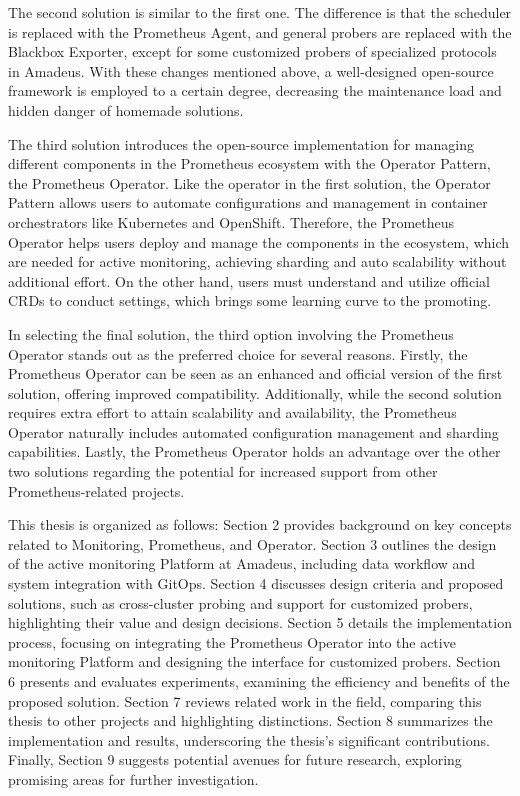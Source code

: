 The second solution is similar to the first one. The difference is that the scheduler is replaced with the Prometheus Agent, and general probers are replaced with the Blackbox Exporter, except for some customized probers of specialized protocols in Amadeus. With these changes mentioned above, a well-designed open-source framework is employed to a certain degree, decreasing the maintenance load and hidden danger of homemade solutions. 

The third solution introduces the open-source implementation for managing different components in the Prometheus ecosystem with the Operator Pattern, the Prometheus Operator. Like the operator in the first solution, the Operator Pattern allows users to automate configurations and management in container orchestrators like Kubernetes and OpenShift. Therefore, the Prometheus Operator helps users deploy and manage the components in the ecosystem, which are needed for active monitoring, achieving sharding and auto scalability without additional effort. On the other hand, users must understand and utilize official \ac{CRD}s to conduct settings, which brings some learning curve to the promoting. 

In selecting the final solution, the third option involving the Prometheus Operator stands out as the preferred choice for several reasons. Firstly, the Prometheus Operator can be seen as an enhanced and official version of the first solution, offering improved compatibility. Additionally, while the second solution requires extra effort to attain scalability and availability, the Prometheus Operator naturally includes automated configuration management and sharding capabilities. Lastly, the Prometheus Operator holds an advantage over the other two solutions regarding the potential for increased support from other Prometheus-related projects.

This thesis is organized as follows: Section 2 provides background on key concepts related to Monitoring, Prometheus, and Operator. Section 3 outlines the design of the active monitoring Platform at Amadeus, including data workflow and system integration with GitOps. Section 4 discusses design criteria and proposed solutions, such as cross-cluster probing and support for customized probers, highlighting their value and design decisions. Section 5 details the implementation process, focusing on integrating the Prometheus Operator into the active monitoring Platform and designing the interface for customized probers. Section 6 presents and evaluates experiments, examining the efficiency and benefits of the proposed solution. Section 7 reviews related work in the field, comparing this thesis to other projects and highlighting distinctions. Section 8 summarizes the implementation and results, underscoring the thesis's significant contributions. Finally, Section 9 suggests potential avenues for future research, exploring promising areas for further investigation. 


